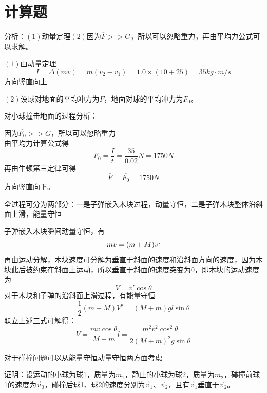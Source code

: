 \documentclass[b5paper,opensource,sourcefont,parskip]{qyxf-book}
\begin{document}
\section{计算题}
\analysis 分析：$(1)$动量定理$(2)$因为$\overline{F}>>G$，所以可以忽略重力，再由平均力公式可以求解。

\solve $(1)$由动量定理
\begin{equation*}
I=\Delta(mv)=m(v_2-v_1)=1.0\times(10+25)=35kg\cdot m/s
\end{equation*}
方向竖直向上

$(2)$设球对地面的平均冲力为$F$，地面对球的平均冲力为$F_0$。

对小球撞击地面的过程分析：

因为$\overline{F_0}>>G$，所以可以忽略重力\\
由平均力计算公式得
\begin{equation*}
\overline{F_0}=\frac{I}{t}=\frac{35}{0.02}N=1750N
\end{equation*}
再由牛顿第三定律可得
\begin{equation*}
\overline{F}=\overline{F_0}=1750N
\end{equation*}
方向竖直向下。


\analysis 全过程可分为两部分：一是子弹嵌入木块过程，动量守恒，二是子弹木块整体沿斜面上滑，能量守恒

\solve 子弹嵌入木块瞬间动量守恒，有
\begin{equation*}
mv=(m+M)v`
\end{equation*}
再由运动分解，木块速度可分解为垂直于斜面的速度和沿斜面方向的速度，因为木块此后被约束在斜面上运动，所以垂直于斜面的速度突变为$0$，即木块的运动速度为
\begin{equation*}
V=v'\cos\theta
\end{equation*}
对于木块和子弹的沿斜面上滑过程，有能量守恒
\begin{equation*}
\frac{1}{2}(m+M)V^2=(M+m)gl\sin\theta
\end{equation*}
联立上述三式可解得：
\begin{equation*}
V=\frac{mv\cos\theta}{M+m}
l=\frac{m^2v^2\cos^2\theta}{2(M+m)^2g\sin\theta}
\end{equation*}


\analysis 对于碰撞问题可以从能量守恒动量守恒两方面考虑

证明：设运动的小球为球1，质量为$m_1$，静止的小球为球2，质量为$m_2$，碰撞前球1的速度为$\vec{v}_0$，碰撞后球1、球2的速度分别为$\vec{v}_1、\vec{v}_2$，且有$\vec{v}_1$垂直于$\vec{v}_2$。
			
\end{document}
